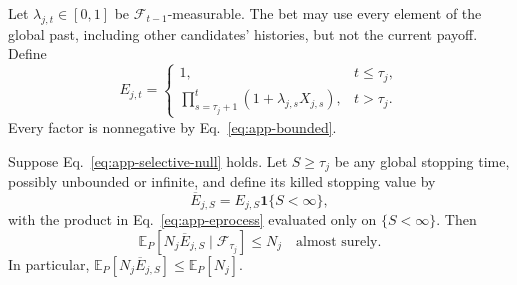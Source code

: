 Let \(\lambda_{j,t}\in[0,1]\) be
\(\mathcal F_{t-1}\)-measurable.  The bet may use every element of the global
past, including other candidates' histories, but not the current payoff.
Define
\begin{equation}
  E_{j,t}=
  \begin{cases}
    1, & t\leq\tau_j,\\[1mm]
    \displaystyle\prod_{s=\tau_j+1}^{t}
       (1+\lambda_{j,s}X_{j,s}), & t>\tau_j .
  \end{cases}
  \label{eq:app-eprocess}
\end{equation}
Every factor is nonnegative by Eq.~\eqref{eq:app-bounded}.

\begin{lemma}
\label{lem:app-selective-e}
Suppose Eq.~\eqref{eq:app-selective-null} holds.  Let \(S\geq\tau_j\) be any
global stopping time, possibly unbounded or infinite, and define its killed
stopping value by
\[
  \overline E_{j,S}
  =E_{j,S}\mathbf 1\{S<\infty\},
\]
with the product in Eq.~\eqref{eq:app-eprocess} evaluated only on
\(\{S<\infty\}\).  Then
\begin{equation}
  \mathbb E_P[N_j\overline E_{j,S}\mid\mathcal F_{\tau_j}]
  \leq N_j\quad\text{almost surely}.
  \label{eq:app-selective-e}
\end{equation}
In particular,
\(\mathbb E_P[N_j\overline E_{j,S}]\leq\mathbb E_P[N_j]\).
\end{lemma}

